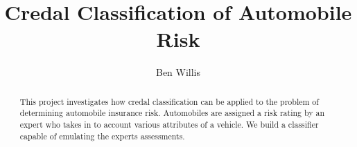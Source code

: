 \documentclass[11pt]{report}
\begin{document}
\title{Credal Classification of Automobile Risk}
\author{Ben Willis}
\maketitle

\begin{abstract}
	This project investigates how credal classification can be applied to the problem of determining automobile insurance risk. Automobiles are assigned a risk rating by an expert who takes in to account various attributes of a vehicle. We build a classifier capable of emulating the experts assessments.
\end{abstract}

\tableofcontents







%


\end{document}
